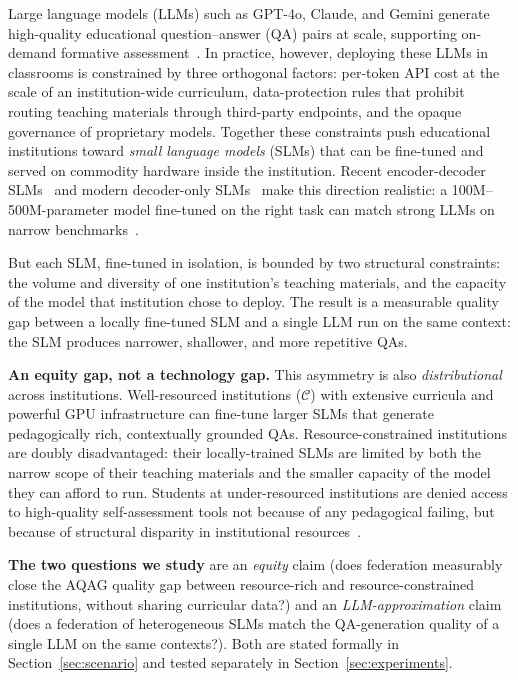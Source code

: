 \documentclass[11pt]{article}
\theoremstyle{plain}
\theoremstyle{definition}
\theoremstyle{remark}
\begin{document}
Large language models (LLMs) such as GPT-4o, Claude,
and Gemini generate high-quality educational
question--answer (QA) pairs at scale, supporting
on-demand formative
assessment~\citep{kurdi2020systematic,
roediger2006power, butler2008feedback}. In practice,
however, deploying these LLMs in classrooms is
constrained by three orthogonal factors: per-token API
cost at the scale of an institution-wide curriculum,
data-protection rules that prohibit routing teaching
materials through third-party endpoints, and the
opaque governance of proprietary models. Together
these constraints push educational institutions toward
\emph{small language models} (SLMs) that can be
fine-tuned and served on commodity hardware inside the
institution. Recent encoder-decoder
SLMs~\citep{lewis2020bart, raffel2020exploring,
beltagy2020longformer, chung2024scaling} and modern
decoder-only SLMs~\citep{abdin2024phi3, team2024gemma,
grattafiori2024llama3, jiang2023mistral} make this
direction realistic: a 100M--500M-parameter model
fine-tuned on the right task can match strong LLMs on
narrow benchmarks~\citep{qin2025slm_survey}.

But each SLM, fine-tuned in isolation, is bounded by
two structural constraints: the volume and diversity
of one institution's teaching materials, and the
capacity of the model that institution chose to
deploy. The result is a measurable quality gap between
a locally fine-tuned SLM and a single LLM run on the
same context: the SLM produces narrower, shallower,
and more repetitive QAs.

\textbf{An equity gap, not a technology gap.}
This asymmetry is also \emph{distributional} across
institutions. Well-resourced institutions
($\mathcal{C}$) with extensive curricula and powerful
GPU infrastructure can fine-tune larger SLMs that
generate pedagogically rich, contextually grounded
QAs. Resource-constrained institutions are doubly
disadvantaged: their locally-trained SLMs are limited
by both the narrow scope of their teaching materials
and the smaller capacity of the model they can
afford to run. Students at under-resourced
institutions are denied access to high-quality
self-assessment tools not because of any pedagogical
failing, but because of structural disparity in
institutional resources~\citep{unterhalter2019measuring,
miao2021artificial}.

\textbf{The two questions we study} are an
\emph{equity} claim (does federation measurably
close the AQAG quality gap between resource-rich
and resource-constrained institutions, without
sharing curricular data?) and an
\emph{LLM-approximation} claim (does a federation
of heterogeneous SLMs match the QA-generation
quality of a single LLM on the same contexts?).
Both are stated formally in
Section~\ref{sec:scenario} and tested separately in
Section~\ref{sec:experiments}.
\end{document}
